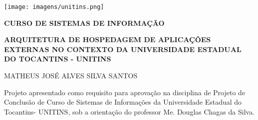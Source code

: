 
\imprimircapa

\imprimirfolhaderosto


%
% 
%
\begin{folhadeaprovacao}

 		\texttt{[image: imagens/unitins.png]}
  		
				
  
  		
  		
  

\centering
\textbf{CURSO DE SISTEMAS DE INFORMAÇÃO}

\par
\vspace*{1cm}     

\centering
\textbf{ARQUITETURA DE HOSPEDAGEM DE APLICAÇÕES EXTERNAS NO CONTEXTO DA UNIVERSIDADE ESTADUAL DO TOCANTINS - UNITINS}

\par
\vspace*{1cm}     

\centering
MATHEUS JOSÉ ALVES SILVA SANTOS

\par
\vspace*{0.5cm}     
\begin{flushright}
	\begin{minipage}{9cm}
Projeto apresentado como requisito para aprovação na disciplina de Projeto de Conclusão de Curso de Sistemas de Informações da Universidade Estadual do Tocantins- UNITINS, sob a orientação do professor Me. Douglas Chagas da Silva.
	\end{minipage}
\end{flushright}



\end{folhadeaprovacao}
